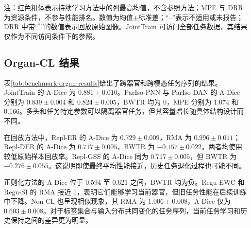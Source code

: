 \begin{table}[htbp]
\vspace{2pt}
\begin{minipage}{0.98\textwidth}
\footnotesize 注：红色粗体表示持续学习方法中的列最高均值，不含参照方法；MPE 与 DRR 为资源条件，不参与性能排名。数值为均值$\pm$标准差；“--”表示不适用或未报告；DRR 中带“$^{*}$”的数值表示回放原始图像。JointTrain 可访问全部任务数据，其结果仅作为不同访问条件下的参照。
\end{minipage}
\end{table}

\subsection*{Organ-CL 结果}

表\ref{tab:benchmark-organ-results}给出了跨器官和跨模态任务序列的结果。JointTrain 的 A-Dice 为 $0.881\pm0.010$。ParIso-PNN 与 ParIso-DAN 的 A-Dice 分别为 $0.839\pm0.004$ 和 $0.824\pm0.005$，BWTR 均为 0，MPE 分别为 1.074 和 0.166。多头和任务特定参数可以隔离器官任务，但其容量增长随具体结构设计而不同。

在回放方法中，Repl-ER 的 A-Dice 为 $0.729\pm0.009$，RMA 为 $0.996\pm0.011$；Repl-DER 的 A-Dice 为 $0.717\pm0.005$，BWTR 为 $-0.157\pm0.022$。两者均使用较低原始样本回放率。Repl-GSS 的 A-Dice 同为 $0.717\pm0.005$，但 BWTR 为 $-0.276\pm0.055$。这说明即使最终平均性能接近，历史任务退化过程也可能不同。

正则化方法的 A-Dice 位于 0.594 至 0.621 之间，BWTR 均为负。Regu-EWC 和 Regu-SI 的 RMA 接近 1，表明它们能够学习当前器官，但旧任务性能在后续训练中下降。Non-CL 也呈现相似现象，其 RMA 为 $1.006\pm0.008$，A-Dice 仅为 $0.603\pm0.008$。对于标签集合与输入分布共同变化的任务序列，当前任务学习和历史保持之间的差异更为明显。

